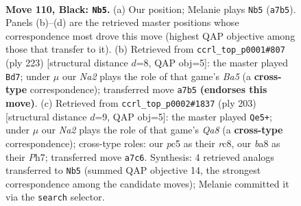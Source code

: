 \documentclass[11pt]{article}
\begin{document}
\clearpage

\begin{figure}[p]\centering
\begin{subfigure}{0.46\textwidth}\centering
\resizebox{\linewidth}{!}{%
\newchessgame
\chessboard[
  setfen={B7/n5k1/8/2P3P1/6KP/8/8/8 b - - 2 110},
  showmover=false,
  pgfstyle=straightmove, color=movearrow, markmove={a7-b5}
]}
\caption{}
\end{subfigure}\hfill
\begin{subfigure}{0.46\textwidth}\centering
\resizebox{\linewidth}{!}{%
\newchessgame
\chessboard[
  setfen={7B/8/7k/8/b3P3/4KP2/8/8 b - - 48 112},
  showmover=false,
  pgfstyle=straightmove, color=movearrow, markmove={a4-d7}
]}
\caption{}
\end{subfigure}
\\[4pt]
\begin{subfigure}{0.46\textwidth}\centering
\resizebox{\linewidth}{!}{%
\newchessgame
\chessboard[
  setfen={2R5/7p/8/8/8/7P/4k1PK/q7 b - - 64 102},
  showmover=false,
  pgfstyle=straightmove, color=movearrow, markmove={a1-e5}
]}
\caption{}
\end{subfigure}\hfill

\caption{\textbf{Move 110, Black: \texttt{Nb5}.} (a) Our position; Melanie plays \texttt{Nb5} (\texttt{a7b5}). Panels (b)--(d) are the retrieved master positions whose correspondence most drove this move (highest QAP objective among those that transfer to it). (b) Retrieved from \texttt{ccrl\_top\_p0001\#807} (ply 223) [structural distance $d$=8, QAP obj=5]: the master played \texttt{Bd7}; under $\mu$ our \emph{Na2} plays the role of that game's \emph{Ba5} (a \textbf{cross-type} correspondence); transferred move \texttt{a7b5} \textbf{(endorses this move)}. (c) Retrieved from \texttt{ccrl\_top\_p0002\#1837} (ply 203) [structural distance $d$=9, QAP obj=5]: the master played \texttt{Qe5+}; under $\mu$ our \emph{Na2} plays the role of that game's \emph{Qa8} (a \textbf{cross-type} correspondence); cross-type roles: our \emph{p}c5 as their \emph{r}c8, our \emph{b}a8 as their \emph{P}h7; transferred move \texttt{a7c6}. Synthesis: 4 retrieved analogs transferred to \texttt{Nb5} (summed QAP objective 14, the strongest correspondence among the candidate moves); Melanie committed it via the \texttt{search} selector.}
\label{fig:thought-m219}
\end{figure}

\clearpage
\end{document}
